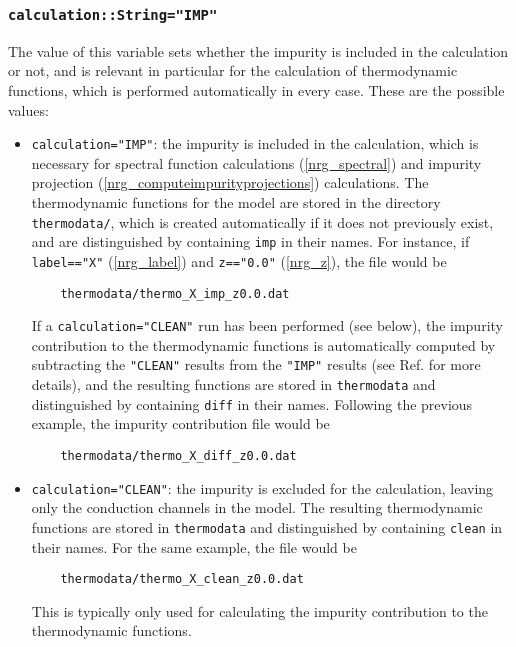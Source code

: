 \documentclass[notitlepage]{article}
\begin{document}
\subsubsection{\texttt{calculation::String="IMP"}}
\label{nrg_calculation}
The value of this variable sets whether the impurity is
included in the calculation or not, and is relevant in
particular for the calculation of thermodynamic functions,
which is performed automatically in every case. These are
the possible values:
\begin{itemize}
    \item \texttt{calculation="IMP"}: the impurity is
    included in the calculation, which is necessary for
    spectral function calculations (\ref{nrg_spectral}) and
    impurity projection
    (\ref{nrg_computeimpurityprojections}) calculations. The
    thermodynamic functions for the model are stored in the
    directory \texttt{thermodata/}, which is created
    automatically if it does not previously exist, and are
    distinguished by containing \texttt{imp} in their names.
    For instance, if \texttt{label=="X"} (\ref{nrg_label})
    and \texttt{z=="0.0"} (\ref{nrg_z}), the file would be
\begin{verbatim}
    thermodata/thermo_X_imp_z0.0.dat
\end{verbatim}
    If a \texttt{calculation="CLEAN"} run has been performed
    (see below), the impurity contribution to the
    thermodynamic functions is automatically computed by
    subtracting the \texttt{"CLEAN"} results from the
    \texttt{"IMP"} results (see Ref. \cite{bulla2008} for
    more details), and the resulting functions are stored in
    \texttt{thermodata} and distinguished by containing
    \texttt{diff} in their names. Following the previous
    example, the impurity contribution file would be
\begin{verbatim}
    thermodata/thermo_X_diff_z0.0.dat
\end{verbatim}
    \item \texttt{calculation="CLEAN"}: the impurity is
    excluded for the calculation, leaving only the
    conduction channels in the model. The resulting
    thermodynamic functions are stored in
    \texttt{thermodata} and distinguished by containing
    \texttt{clean} in their names. For the same example, the
    file would be
\begin{verbatim}
    thermodata/thermo_X_clean_z0.0.dat
\end{verbatim}
    This is typically only
    used for calculating the impurity contribution to the
    thermodynamic functions. 

\end{itemize}
\end{document}
